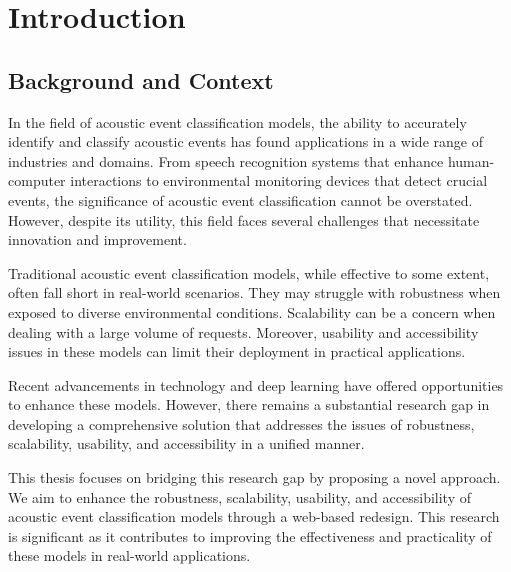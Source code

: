 \chapter{Introduction}
\setcounter{page}{1}

\section{Background and Context}

In the field of acoustic event classification models, the ability to accurately identify and classify acoustic events has found applications in a wide range of industries and domains\cite{SHARAN201724}. From speech recognition systems that enhance human-computer interactions\cite{6857341} to environmental monitoring devices that detect crucial events\cite{Lasseck2015LargescaleIO}\cite{Kahl2017LargeScaleBS}\cite{KHF17_Acoustic_Event_Classification_Using_Convolutional_Neural_Networks}\cite{sampath2020low}, the significance of acoustic event classification cannot be overstated. However, despite its utility, this field faces several challenges that necessitate innovation and improvement.

Traditional acoustic event classification models, while effective to some extent, often fall short in real-world scenarios. They may struggle with robustness when exposed to diverse environmental conditions. Scalability can be a concern when dealing with a large volume of requests. Moreover, usability and accessibility issues in these models can limit their deployment in practical applications\cite{sampath2019realtime}.

Recent advancements in technology and deep learning have offered opportunities to enhance these models. However, there remains a substantial research gap in developing a comprehensive solution that addresses the issues of robustness, scalability, usability, and accessibility in a unified manner.

This thesis focuses on bridging this research gap by proposing a novel approach. We aim to enhance the robustness, scalability, usability, and accessibility of acoustic event classification models through a web-based redesign. This research is significant as it contributes to improving the effectiveness and practicality of these models in real-world applications.

